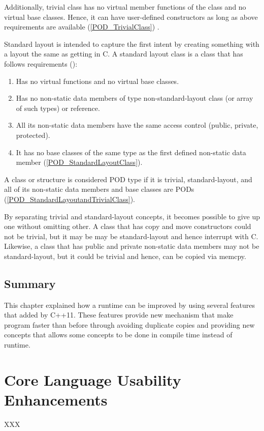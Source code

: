 \documentclass[11pt]{report}
\begin{document}
Additionally, trivial class has no virtual member functions of the class and no virtual base classes. Hence, it can have user-defined constructors as long as above requirements are available (\ref{POD_TrivialClass}) \cite{ISO:2011:Cpplanguage}.

Standard layout is intended to capture the first intent by creating something with a layout the same as getting in C. A standard layout class is a class that has follows requirements (\cite{ISO:2011:Cpplanguage}):

\begin{enumerate}
\item	Has no virtual functions and no virtual base classes.
\item	Has no non-static data members of type non-standard-layout class (or array of such types) or reference.
\item	All its non-static data members have the same access control (public, private, protected).
\item	It has no base classes of the same type as the first defined non-static data member (\ref{POD_StandardLayoutClass}).
\end{enumerate}

A class or structure is considered POD type if it is trivial, standard-layout, and all of its non-static data members and base classes are PODs (\ref{POD_StandardLayoutandTrivialClass}).

By separating trivial and standard-layout concepts, it becomes possible to give up one without omitting other. A class that has copy  and move constructors could not be trivial, but it may be may be standard-layout and hence interrupt with C. Likewise, a class that has  public and private non-static data members may not be standard-layout, but it could be trivial and hence, can be copied via memcpy.

\section{Summary}
\label{sec: Summary}
This chapter explained how a runtime can be improved by using several features that added by C++11.  These features provide new mechanism that make program faster than before through avoiding duplicate copies and providing new concepts that allows some concepts to be done in compile time instead of runtime.

\chapter{Core Language Usability Enhancements}
\label{chapter: Usability Enhancements}
XXX
\end{document}
